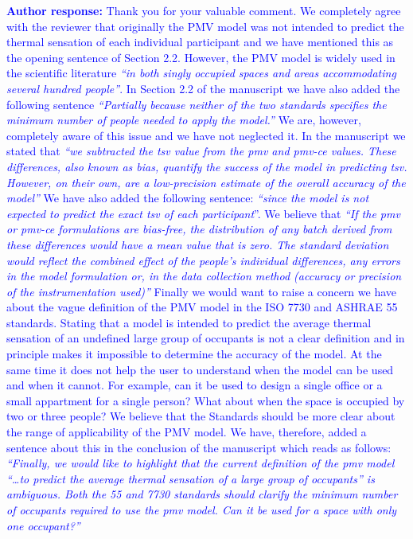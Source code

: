 \documentclass[a4paper, 10pt]{letter}
\newcommand{\response}[1]{\textcolor{blue}{\textbf{Author response:} #1}}
\begin{document}
\begin{letter}
\begin{enumerate}
            \response{
                Thank you for your valuable comment.
                We completely agree with the reviewer that originally the PMV model was not intended to predict the thermal sensation of each individual participant and we have mentioned this as the opening sentence of Section 2.2.
                However, the PMV model is widely used in the scientific literature \textit{``in both singly occupied spaces and areas accommodating several hundred people''}.
                In Section 2.2 of the manuscript we have also added the following sentence \textit{``Partially because neither of the two standards specifies the minimum number of people needed to apply the model.''}
                We are, however, completely aware of this issue and we have not neglected it.
                In the manuscript we stated that \textit{``we subtracted the \ac{tsv} value from the \ac{pmv} and \ac{pmv-ce} values.
                These differences, also known as bias, quantify the success of the model in predicting \ac{tsv}.
                However, on their own, are a low-precision estimate of the overall accuracy of the model''}
                We have also added the following sentence: \textit{``since the model is not expected to predict the exact \ac{tsv} of each participant}''.
                We believe that \textit{``If the \ac{pmv} or \ac{pmv-ce} formulations are bias-free, the distribution of any batch derived from these differences would have a mean value that is zero.
                The standard deviation would reflect the combined effect of the people's individual differences, any errors in the model formulation or, in the data collection method (accuracy or precision of the instrumentation used)''}
                Finally we would want to raise a concern we have about the vague definition of the PMV model in the ISO 7730 and ASHRAE 55 standards.
                Stating that a model is intended to predict the average thermal sensation of an undefined large group of occupants is not a clear definition and in principle makes it impossible to determine the accuracy of the model.
                At the same time it does not help the user to understand when the model can be used and when it cannot.
                For example, can it be used to design a single office or a small appartment for a single person?
                What about when the space is occupied by two or three people?
                We believe that the Standards should be more clear about the range of applicability of the PMV model.
                We have, therefore, added a sentence about this in the conclusion of the manuscript which reads as follows: \textit{``Finally, we would like to highlight that the current definition of the \ac{pmv} model ``\ldots to predict the average thermal sensation of a large group of occupants'' is ambiguous.
                Both the \gls{55} and \gls{7730} standards should clarify the minimum number of occupants required to use the \ac{pmv} model.
                Can it be used for a space with only one occupant?''}
            }


\end{enumerate}
\end{letter}
\end{document}
